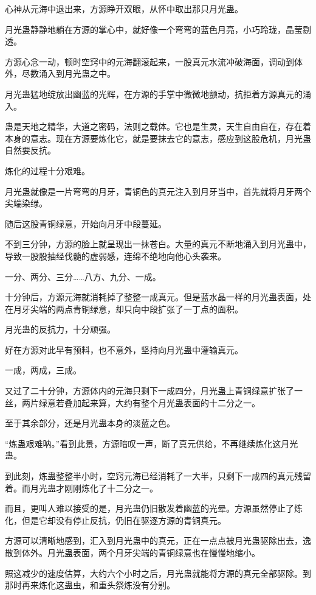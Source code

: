 \begin{this_body}
心神从元海中退出来，方源睁开双眼，从怀中取出那只月光蛊。

月光蛊静静地躺在方源的掌心中，就好像一个弯弯的蓝色月亮，小巧玲珑，晶莹剔透。

方源心念一动，顿时空窍中的元海翻滚起来，一股真元水流冲破海面，调动到体外，尽数涌入到月光蛊之中。

月光蛊猛地绽放出幽蓝的光辉，在方源的手掌中微微地颤动，抗拒着方源真元的涌入。

蛊是天地之精华，大道之密码，法则之载体。它也是生灵，天生自由自在，存在着本身的意志。现在方源要炼化它，就是要抹去它的意志，感应到这股危机，月光蛊自然要反抗。

炼化的过程十分艰难。

月光蛊就像是一片弯弯的月牙，青铜色的真元注入到月牙当中，首先就将月牙两个尖端染绿。

随后这股青铜绿意，开始向月牙中段蔓延。

不到三分钟，方源的脸上就呈现出一抹苍白。大量的真元不断地涌入到月光蛊中，导致一股股抽经伐髓的虚弱感，连绵不绝地向他心头袭来。

一分、两分、三分……八方、九分、一成。

十分钟后，方源元海就消耗掉了整整一成真元。但是蓝水晶一样的月光蛊表面，处在月牙尖端的两点青铜绿意，却只向中段扩张了一丁点的面积。

月光蛊的反抗力，十分顽强。

好在方源对此早有预料，也不意外，坚持向月光蛊中灌输真元。

一成，两成，三成。

又过了二十分钟，方源体内的元海只剩下一成四分，月光蛊上青铜绿意扩张了一丝，两片绿意若叠加起来算，大约有整个月光蛊表面的十二分之一。

至于其余部分，还是月光蛊本身的淡蓝之色。

“炼蛊艰难呐。”看到此景，方源暗叹一声，断了真元供给，不再继续炼化这月光蛊。

到此刻，炼蛊整整半小时，空窍元海已经消耗了一大半，只剩下一成四的真元残留着。而月光蛊才刚刚炼化了十二分之一。

而且，更叫人难以接受的是，月光蛊仍旧散发着幽蓝的光晕。方源虽然停止了炼化，但是它却没有停止反抗，仍旧在驱逐方源的青铜真元。

方源可以清晰地感到，汇入到月光蛊中的真元，正在一点点被月光蛊驱除出去，逸散到体外。月光蛊表面，两个月牙尖端的青铜绿意也在慢慢地缩小。

照这减少的速度估算，大约六个小时之后，月光蛊就能将方源的真元全部驱除。到那时再来炼化这蛊虫，和重头祭炼没有分别。


\end{this_body}
